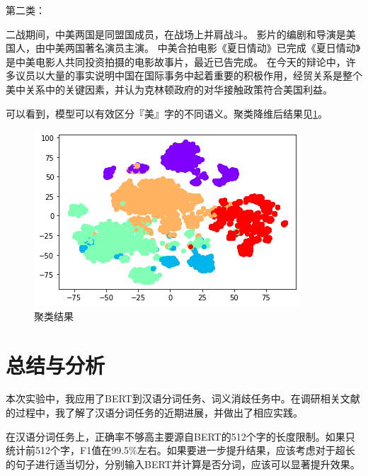 \documentclass{ctexart}
\begin{document}
第二类：
\begin{outline}
\1     二战期间，中美两国是同盟国成员，在战场上并肩战斗。
\1 影片的编剧和导演是美国人，由中美两国著名演员主演。
\1 中美合拍电影《夏日情动》已完成《夏日情动》是中美电影人共同投资拍摄的电影故事片，最近已告完成。
\1 在今天的辩论中，许多议员以大量的事实说明中国在国际事务中起着重要的积极作用，经贸关系是整个美中关系中的关键因素，并认为克林顿政府的对华接触政策符合美国利益。
\end{outline}

可以看到，模型可以有效区分『美』字的不同语义。聚类降维后结果见\cref{fig:wsd}。

\begin{figure}[h]
    \centering
    \includegraphics[width=.5\linewidth]{image1.png}
    \caption{聚类结果}
    \label{fig:wsd}
\end{figure}

\section{总结与分析}
本次实验中，我应用了BERT到汉语分词任务、词义消歧任务中。在调研相关文献的过程中，我了解了汉语分词任务的近期进展，并做出了相应实践。

在汉语分词任务上，正确率不够高主要源自BERT的512个字的长度限制。如果只统计前512个字，F1值在99.5\%左右。如果要进一步提升结果，应该考虑对于超长的句子进行适当切分，分别输入BERT并计算是否分词，应该可以显著提升效果。



\clearpage

\appendix


\end{document}
